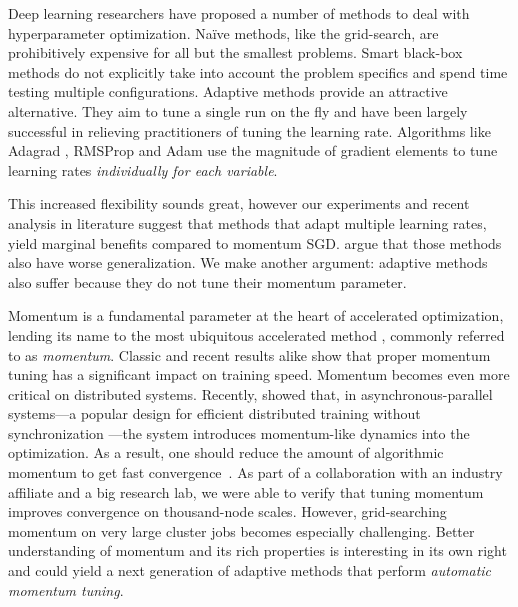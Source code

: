 \documentclass{article}
\newcommand{\yell}[1]{#1}
\newcommand{\outline}[1]{}
\begin{document}
\outline{[previous approach]}
Deep learning researchers have proposed a number of methods to deal with hyperparameter optimization. 
Na\"ive methods, like the grid-search,
are prohibitively expensive for all but the smallest problems. 
Smart black-box methods \cite{bergstra2012random,snoek2012practical}
do not explicitly take into account the problem specifics and spend time testing multiple configurations.
Adaptive methods provide an attractive alternative.
They aim to tune a single run on the fly and have been largely successful in relieving practitioners of tuning the learning rate. 
Algorithms like Adagrad \cite{duchi2011adaptive}, RMSProp \cite{tieleman2012lecture} and Adam \cite{kingma2014adam} use the magnitude of gradient elements to tune learning rates {\em individually for each variable}.
\yell{
This increased flexibility sounds great,
however our experiments and recent analysis in literature \cite{wilson2017marginal} suggest that methods that adapt multiple learning rates, yield marginal benefits compared to momentum SGD.
\citet{wilson2017marginal} argue that those methods also have worse generalization.
We make another argument: adaptive methods also suffer because they do not tune their momentum parameter.
}

Momentum is a fundamental parameter at the heart of accelerated optimization,
lending its name to the most ubiquitous accelerated method \cite{polyak1964some}, commonly referred to as {\em momentum}.
Classic \cite{polyak1964some} and recent results \cite{sutskever2013importance} alike show that proper momentum tuning has a significant impact on training speed. 
Momentum becomes even more critical on distributed systems. 
Recently, \citet{mitliagkas2016asynchrony} showed that, in asynchronous-parallel systems---a popular design for efficient distributed training without synchronization 
\cite{recht2011hogwild,dean2012large,chilimbi2014project,hadjis2016omnivore}---the system introduces momentum-like dynamics into the optimization.
As a result,
one should reduce the amount of algorithmic momentum to get fast convergence~\cite{hadjis2016omnivore}.
As part of a collaboration with an industry affiliate and a big research lab, we were able to verify that tuning momentum improves convergence on thousand-node scales.
However, grid-searching momentum on very large cluster jobs becomes especially challenging.
Better understanding of momentum and its rich properties is interesting in its own right and could yield a next generation of adaptive methods that perform {\em automatic momentum tuning}. 
\end{document}
